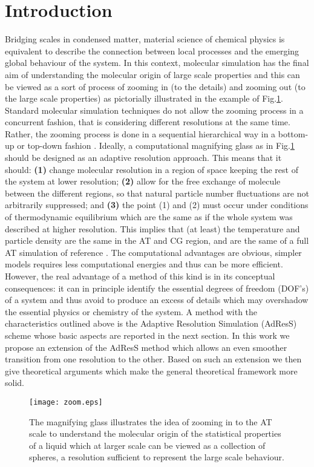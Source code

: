 \documentclass[aps,pre,preprint]{revtex4}
\begin{document}
\section{Introduction}
Bridging scales in condensed matter, material science of chemical physics is equivalent to describe the connection between local processes and the emerging global behaviour of the system. In this context, molecular simulation has the final aim of understanding the molecular origin of large scale properties and this can be viewed as a sort of process of zooming in (to the details) and zooming out (to the large scale properties) as pictorially illustrated in the example of Fig.\ref{zoom}. Standard molecular simulation techniques do not allow the zooming process in a concurrent fashion, that is considering different resolutions at the same time. Rather, the zooming process is done in a sequential hierarchical way in a bottom-up or top-down fashion \cite{annurev}. Ideally, a computational magnifying glass as in Fig.\ref{zoom} should be designed as an adaptive resolution approach. This means that it should: {\bf (1)} change molecular resolution in a region of space keeping the rest of the system at lower resolution; {\bf (2)} allow for the free exchange of molecule between the different regions, so that natural particle number fluctuations  are not arbitrarily suppressed; and {\bf (3)} the point (1) and (2) must occur under conditions of thermodynamic equilibrium which are the same as if the whole system was described at higher resolution.
This implies that (at least) the temperature and particle density are the same in the AT and CG region, and are the same of a full AT simulation of reference \cite{annurev}. The computational advantages are obvious, simpler models requires less computational energies and thus can be more efficient. However, the real advantage of a method of this kind is in its conceptual consequences: it can in principle identify the essential degrees of freedom (DOF's) of a system and thus avoid to produce an excess of details which may overshadow the essential physics or chemistry of the system. A method with the characteristics outlined above is the Adaptive Resolution Simulation (AdResS) scheme \cite{jcp,pre} whose basic aspects are reported in the next section. In this work we propose an extension of the AdResS method which allows an even smoother transition from one resolution to the other. Based on such an extension we then give theoretical arguments which make the general theoretical framework more solid.
\begin{figure}
  \centering
  \texttt{[image: zoom.eps]}
  \caption{The magnifying glass illustrates the idea of zooming in to the AT scale to understand the molecular origin of the statistical properties of a liquid which at larger scale can be viewed as a collection of spheres, a resolution sufficient to represent the large scale behaviour.}
  \label{zoom}
\end{figure} 
\end{document}
